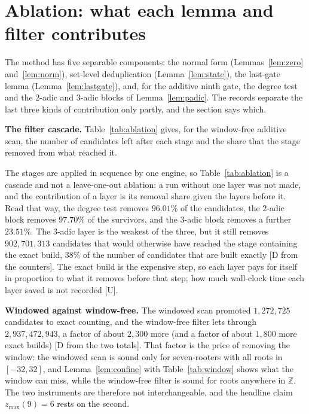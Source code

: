 \documentclass[11pt]{article}
\theoremstyle{definition}
\theoremstyle{remark}
\newcommand{\Z}{\mathbb{Z}}
\newcommand{\zmax}{z_{\max}}
\begin{document}
\section{Ablation: what each lemma and filter contributes}\label{sec:ablation}

The method has five separable components: the normal form (Lemmas~\ref{lem:zero} and~\ref{lem:norm}),
set-level deduplication (Lemma~\ref{lem:state}), the last-gate lemma (Lemma~\ref{lem:lastgate}), and, for
the additive ninth gate, the degree test and the $2$-adic and $3$-adic blocks of Lemma~\ref{lem:padic}.
The records separate the last three kinds of contribution only partly, and the section says which.

\textbf{The filter cascade.} Table~\ref{tab:ablation} gives, for the window-free additive scan, the number
of candidates left after each stage and the share that the stage removed from what reached it.

\begin{table}[t]
\centering
\caption{Candidates left after each stage of the window-free additive scan of the ninth gate (from the
counters of \texttt{EXP-015}) and the share of its input that each stage removed; the last row is the
windowed scan of the same $4000 \times 1{,}048{,}460{,}912$ candidates (\texttt{EXP-013}), which
promotes far fewer candidates to exact counting but is sound only for roots in $[-32,32]$.}
\label{tab:ablation}

\end{table}

The stages are applied in sequence by one engine, so Table~\ref{tab:ablation} is a cascade and not a
leave-one-out ablation: a run without one layer was not made, and the contribution of a layer is its
removal share given the layers before it. Read that way, the degree test removes $96.01\%$ of the
candidates, the $2$-adic block removes $97.70\%$ of the survivors, and the
$3$-adic block removes a further $23.51\%$. The $3$-adic layer is the weakest of the three, but it still
removes $902{,}701{,}313$ candidates that would otherwise have reached the stage containing the exact
build, $38\%$ of the number of candidates that are built exactly [D from the counters]. The exact build is
the expensive step, so each layer pays for itself in proportion to what it removes before that step;
how much wall-clock time each layer saved is not recorded [U].

\textbf{Windowed against window-free.} The windowed scan promoted $1{,}272{,}725$ candidates to exact
counting, and the window-free filter lets through $2{,}937{,}472{,}943$, a factor of about $2{,}300$ more
(and a factor of about $1{,}800$ more exact builds) [D from the two totals]. That factor is the price
of removing the window: the windowed scan is sound only for seven-rooters with all roots in
$[-32,32]$, and Lemma~\ref{lem:confine} with Table~\ref{tab:window} shows what the window can miss, while
the window-free filter is sound for roots anywhere in $\Z$. The two instruments are therefore not
interchangeable, and the headline claim $\zmax(9) = 6$ rests on the second.
\end{document}
